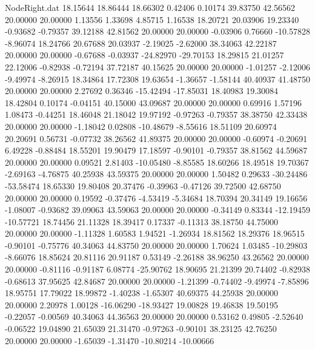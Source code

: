 \begin{filecontents}{NodeRight.dat}
  18.15644   18.86444   18.66302     0.42406    0.10174   39.83750   42.56562   20.00000   20.00000    1.13556    1.33698    4.85715    1.16538
  18.20721   20.03906   19.23340    -0.93682   -0.79357   39.12188   42.81562   20.00000   20.00000   -0.03906    0.76660  -10.57828   -8.96074
  18.24766   20.67688   20.03937    -2.19025   -2.62000   38.34063   42.22187   20.00000   20.00000   -0.67688   -0.03937  -24.82970  -29.70153
  18.29815   21.01257   22.12006    -0.82938   -0.72194   37.72187   40.15625   20.00000   20.00000   -1.01257   -2.12006   -9.49974   -8.26915
  18.34864   17.72308   19.63654    -1.36657   -1.58144   40.40937   41.48750   20.00000   20.00000    2.27692    0.36346  -15.42494  -17.85031
  18.40983   19.30084   18.42804     0.10174   -0.04151   40.15000   43.09687   20.00000   20.00000    0.69916    1.57196    1.08473   -0.44251
  18.46048   21.18042   19.97192    -0.97263   -0.79357   38.38750   42.33438   20.00000   20.00000   -1.18042    0.02808  -10.48679   -8.55616
  18.51109   20.60974   20.20691     0.56731   -0.07732   38.26562   41.89375   20.00000   20.00000   -0.60974   -0.20691    6.49228   -0.88484
  18.55201   19.90479   17.18597    -0.90101   -0.79357   38.81562   44.59687   20.00000   20.00000    0.09521    2.81403  -10.05480   -8.85585
  18.60266   18.49518   19.70367    -2.69163   -4.76875   40.25938   43.59375   20.00000   20.00000    1.50482    0.29633  -30.24486  -53.58474
  18.65330   19.80408   20.37476    -0.39963   -0.47126   39.72500   42.68750   20.00000   20.00000    0.19592   -0.37476   -4.53419   -5.34684
  18.70394   20.34149   19.16656    -1.08007   -0.93682   39.09063   43.59063   20.00000   20.00000   -0.34149    0.83344  -12.19459  -10.57721
  18.74456   21.11328   18.39417     0.17337   -0.11313   38.18750   44.75000   20.00000   20.00000   -1.11328    1.60583    1.94521   -1.26934
  18.81562   18.29376   18.96515    -0.90101   -0.75776   40.34063   44.83750   20.00000   20.00000    1.70624    1.03485  -10.29803   -8.66076
  18.85624   20.81116   20.91187     0.53149   -2.26188   38.96250   43.26562   20.00000   20.00000   -0.81116   -0.91187    6.08774  -25.90762
  18.90695   21.21399   20.74402    -0.82938   -0.68613   37.95625   42.84687   20.00000   20.00000   -1.21399   -0.74402   -9.49974   -7.85896
  18.95751   17.79022   18.99872    -1.40238   -1.65307   40.69375   44.25938   20.00000   20.00000    2.20978    1.00128  -16.06290  -18.93427
  19.00828   19.46838   19.50195    -0.22057   -0.00569   40.34063   44.36563   20.00000   20.00000    0.53162    0.49805   -2.52640   -0.06522
  19.04890   21.65039   21.31470    -0.97263   -0.90101   38.23125   42.76250   20.00000   20.00000   -1.65039   -1.31470  -10.80214  -10.00666

\end{filecontents}
